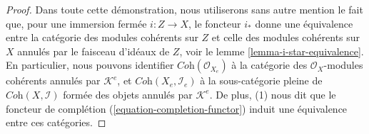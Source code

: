 \begin{proof}
Dans toute cette démonstration, nous utiliserons sans autre mention le fait que, pour une immersion
fermée $i : Z \to X$, le foncteur $i_*$ donne une équivalence entre la
catégorie des modules cohérents sur $Z$ et celle des modules cohérents sur $X$ annulés
par le faisceau d'idéaux de $Z$, voir le lemme \ref{lemma-i-star-equivalence}.
En particulier, nous pouvons identifier $\textit{Coh}(\mathcal{O}_{X_e})$
à la catégorie des $\mathcal{O}_X$-modules cohérents annulés par
$\mathcal{K}^e$, et $\textit{Coh}(X_e, \mathcal{I}_e)$ à la sous-catégorie pleine
de $\textit{Coh}(X, \mathcal{I})$ formée des objets annulés par $\mathcal{K}^e$.
De plus, (1) nous dit que le foncteur de
complétion (\ref{equation-completion-functor}) induit une équivalence entre ces catégories.


\end{proof}
